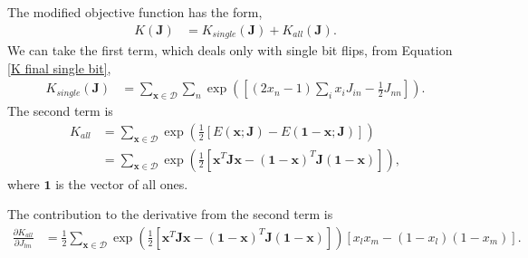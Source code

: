 \documentclass{article}
\newcommand{\pd}[2]{\frac{\partial #1}{\partial #2}}
\newcommand{\mb}{\mathbf}
\begin{document}
The modified objective function has the form, 
\begin{align}
K\left( \mb J \right) & = K_{single}\left( \mb J \right) + K_{all}\left( \mb J \right)
.
\end{align}
We can take the first term, which deals only with single bit flips, from Equation \ref{K final single bit},
\begin{align}
K_{single}\left( \mb J \right) & = \sum_{\mb x \in \mathcal D} \sum_n \exp\left( \left[
\left( 2 x_n - 1 \right) \sum_i x_i J_{in}
-
\frac{1}{2}J_{nn}
\right]
\right)
.
\end{align}
The second term is
\begin{align}
K_{all} & = \sum_{\mb x \in \mathcal D} \exp\left( \frac{1}{2}\left[
E(\mb x; \mb J) - E(\mb 1 - \mb x; \mb J) \right] \right) \\
& = \sum_{\mb x \in \mathcal D} \exp\left( \frac{1}{2}\left[
\mb x^T \mb J \mb x - 
\left( \mb 1 - \mb x\right)^T \mb J \left( \mb 1 - \mb x\right) \right] \right)
,
\end{align}
where $\mb 1$ is the vector of all ones.

The contribution to the derivative from the second term is
\begin{align}
\pd{K_{all}}{J_{lm}} & = \frac{1}{2}\sum_{\mb x \in \mathcal D} \exp\left( \frac{1}{2}\left[
\mb x^T \mb J \mb x - 
\left( \mb 1 - \mb x\right)^T \mb J \left( \mb 1 - \mb x\right) \right] \right)
\left[
x_l x_m - \left( 1 - x_l \right) \left( 1 - x_m \right)
\right]
.
\end{align}
		
\end{document}
